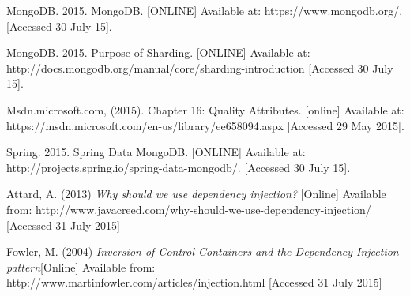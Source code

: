 \begin{flushleft}

\begin{thebibliography}{99}
	 MongoDB. 2015. MongoDB. [ONLINE] Available at: https://www.mongodb.org/. [Accessed 30 July 15].
	
	 MongoDB. 2015. Purpose of Sharding. [ONLINE] Available at: http://docs.mongodb.org/manual/core/sharding-introduction [Accessed 30 July 15].
	
	 Msdn.microsoft.com, (2015). Chapter 16: Quality Attributes. [online]  Available at: https://msdn.microsoft.com/en-us/library/ee658094.aspx [Accessed 29 May 2015].
	
	 Spring. 2015. Spring Data MongoDB. [ONLINE] Available at: http://projects.spring.io/spring-data-mongodb/. [Accessed 30 July 15].
	
	

	 Attard, A. (2013) \textit{Why should we use dependency injection?} [Online] Available from: http://www.javacreed.com/why-should-we-use-dependency-injection/ [Accessed 31 July 2015]
	
	Fowler, M. (2004) \textit{Inversion of Control Containers and the Dependency Injection pattern}[Online] Available from: http://www.martinfowler.com/articles/injection.html [Accessed 31 July 2015]

\end{thebibliography}
\end{flushleft}
